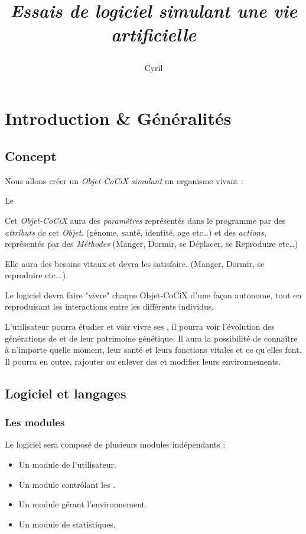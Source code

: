 \documentclass[french]{report}
\title{\begin{Huge}
\CoCiX
\end{Huge}\\
\small
\emph{Essais de logiciel simulant une vie artificielle}
}
\author{Cyril \bsc{LORIN}}
\begin{document}
\maketitle
\newpage
\tableofcontents
\newpage
\chapter{Introduction \& Généralités}
\section{Concept}
Nous allons créer un \textit{Objet-CoCiX} \textit{simulant} un organisme vivant :\\

\begin{center}
\begin{large}
Le \CoCiX
\end{large}
\end{center}

Cet \textit{Objet-CoCiX} aura des \textit{paramètres} représentés dans le programme par des \emph{attributs} de cet \textit{Objet}. (génome, santé, identité, age etc\dots) et des \textit{actions}, représentés par des \emph{Méthodes} (Manger, Dormir, se Déplacer, se Reproduire etc\dots)

Elle aura des besoins vitaux et devra les satisfaire. (Manger, Dormir, se reproduire etc...).

Le logiciel devra faire "vivre" chaque Objet-CoCiX d'une façon autonome, tout en reproduisant les interactions entre les différents individus.

L'utilisateur pourra étudier et voir vivre ses \CoCiX, il pourra voir l'évolution des générations de \CoCiX et de leur patrimoine génétique. Il aura la possibilité de connaître à n'importe quelle moment, leur santé et leurs fonctions vitales et ce qu'elles font. Il pourra en outre, rajouter ou enlever des \CoCiX et modifier leurs environnements.
\section{Logiciel et langages}
\subsection{Les modules}
Le logiciel sera composé de plusieurs modules indépendants :

\begin{itemize}
\item Un module de l'utilisateur.
\item Un module contrôlant les \CoCiX.
\item Un module gérant l'environnement.
\item Un module de statistiques.
\end{itemize}
\end{document}
